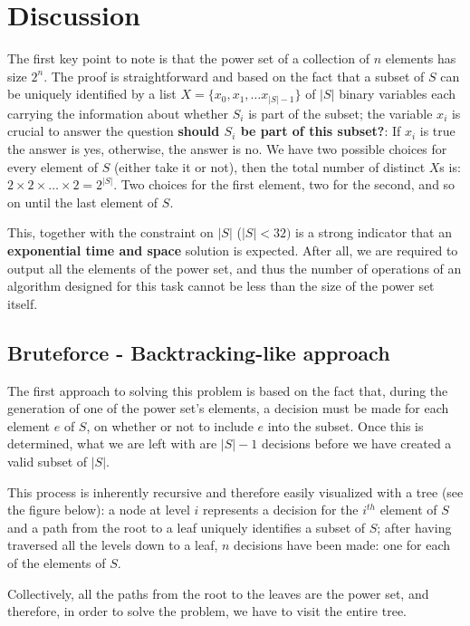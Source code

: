 \section{Discussion}
\label{sec:powerset:discussion}

The first key point to note is that the power set of a collection of $n$ elements has size $2^n$. The proof is straightforward and based on the fact that a subset of $S$ can be uniquely identified by a list $X=\{x_0,x_1,\ldots x_{|S|-1}\}$ of $|S|$ binary variables each carrying the information about whether $S_i$ is part of the subset; the variable $x_i$ is crucial to answer the question \textbf{should $S_i$ be part of this subset?}: If $x_i$ is true the answer is yes, otherwise, the answer is no.
We have two possible choices for every element of $S$ (either take it or not), then the total number of distinct $X$s  is: $2 \times 2 \times \ldots \times 2 = 2^{|S|}$. Two choices for the first element, two for the second, and so 
on until the last element of $S$.
  
This, together with the constraint on $|S|$ ($|S| < 32)$ is a strong indicator that an \textbf{exponential time and space} solution is expected.
After all, we are required to output all the elements of the power set, and thus the number of operations of an algorithm designed for this task cannot be less than the size of the power set itself. 



\subsection{Bruteforce - Backtracking-like approach}

The first approach to solving this problem is based on the fact that,  during the generation of
one of the power set's elements, a decision must be made for each element $e$ of $S$, on whether or not to include $e$ into the subset.
Once this is determined, what we are left with are $|S|-1$ decisions
before we have created a valid subset of $|S|$.

This process is inherently recursive and therefore easily visualized with a tree (see the figure below): a node at level $i$
represents a decision for the $i^{th}$ element of $S$ and a path from the root to a leaf uniquely
identifies a subset of $S$; after having traversed all the levels down to a leaf, $n$ decisions have been made: 
one for each of the elements of $S$. 

Collectively, all the paths from the root to the leaves are the power set, and therefore, in
order to solve the problem, we have to visit the entire tree.


